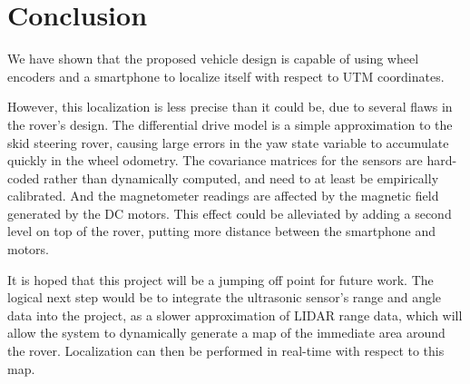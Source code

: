 \chapter*{Conclusion}

We have shown that the proposed vehicle design is capable of using wheel encoders and a smartphone to localize itself with respect to UTM coordinates.

However, this localization is less precise than it could be, due to several flaws in the rover's design. The differential drive model is a simple approximation to the skid steering rover, causing large errors in the yaw state variable to accumulate quickly in the wheel odometry. The covariance matrices for the sensors are hard-coded rather than dynamically computed, and need to at least be empirically calibrated. And the magnetometer readings are affected by the magnetic field generated by the DC motors. This effect could be alleviated by adding a second level on top of the rover, putting more distance between the smartphone and motors.



It is hoped that this project will be a jumping off point for future work. The logical next step would be to integrate the ultrasonic sensor's range and angle data into the project, as a slower approximation of LIDAR range data, which will allow the system to dynamically generate a map of the immediate area around the rover. Localization can then be performed in real-time with respect to this map.




